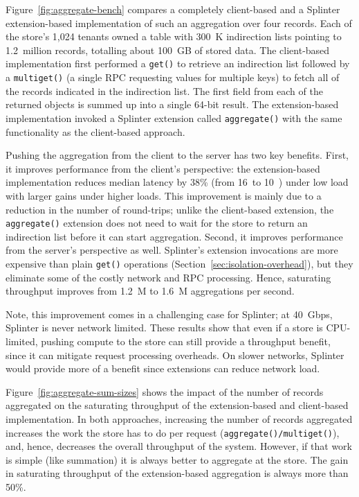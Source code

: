 Figure~\ref{fig:aggregate-bench} compares a completely client-based and a
  Splinter extension-based implementation of such an aggregation over
four
  records.
Each of the store's 1,024 tenants owned a table with 300~K
  indirection lists pointing to 1.2~million records, totalling about 100~GB of
  stored data.
The client-based implementation first performed a \texttt{get()} to
  retrieve an indirection list followed by a \texttt{multiget()} (a single RPC
  requesting values for multiple keys) to fetch all of the records indicated in
  the indirection list.
The first field from each of the returned objects is summed up into a single
  64-bit result.
The extension-based implementation invoked a Splinter extension called
  \texttt{aggregate()} with the same functionality as the client-based approach.

Pushing the aggregation from the client to the server has two key benefits.
First, it improves performance from the client's perspective: the
  extension-based implementation reduces median latency by 38\% (from
  16~\us to 10~\us) under low load with larger gains under higher loads.
This improvement is mainly due to a reduction in the number of round-trips;
unlike the client-based extension, the \texttt{aggregate()} extension
does not
  need to wait for the store to return an indirection list before it can start
  aggregation.
Second, it improves performance from the server's perspective as well.
Splinter's extension invocations are more expensive than plain \texttt{get()}
  operations (Section~\ref{sec:isolation-overhead}), but they eliminate
  some of the costly network and RPC processing.
Hence, saturating throughput improves from 1.2~M to 1.6~M aggregations
  per second.

Note, this improvement comes in a challenging case for Splinter; at 40~Gbps,
  Splinter is never network limited.
These results show that even if a store is CPU-limited, pushing compute to the
  store can still provide a throughput benefit, since it can mitigate
  request processing overheads.
On slower networks, Splinter would provide more of a benefit since extensions
  can reduce network load.

Figure~\ref{fig:aggregate-sum-sizes} shows the impact of the number of
  records aggregated on the saturating throughput of the extension-based
  and client-based implementation.
In both approaches, increasing the number of records aggregated
  increases the work the store has to do per request
  (\texttt{aggregate()/multiget()}), and, hence, decreases the overall
  throughput of the system. 
However, if that work is simple (like summation) it is always better to
  aggregate at the store.
The gain in saturating throughput of the extension-based aggregation is
  always more than 50\%.

